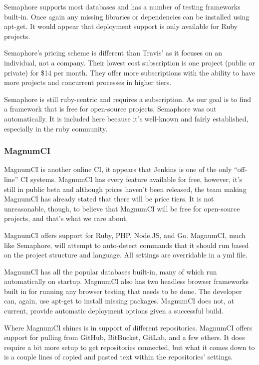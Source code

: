 \documentclass[11pt]{article}
\begin{document}
Semaphore supports most databases and has a number of testing frameworks built-in. Once again any missing libraries or dependencies can be installed using apt-get. It would appear that deployment support is only available for Ruby projects.

Semaphore's pricing scheme is different than Travis' as it focuses on an individual, not a company. Their lowest cost subscription is one project (public or private) for \$14 per month. They offer more subscriptions with the ability to have more projects and concurrent processes in higher tiers.

Semaphore is still ruby-centric and requires a subscription. As our goal is to find a framework that is free for open-source projects, Semaphore was out automatically. It is included here because it's well-known and fairly established, especially in the ruby community.

\subsubsection{MagnumCI \cite{MagnumCI}}
MagnumCI is another online CI, it appears that Jenkins is one of the only ``off-line'' CI systems. MagnumCI has every feature available for free, however, it's still in public beta and although prices haven't been released, the team making MagnumCI has already stated that there will be price tiers. It is not unreasonable, though, to believe that MagnumCI will be free for open-source projects, and that's what we care about.

MagnumCI offers support for Ruby, PHP, Node.JS, and Go. MagnumCI, much like Semaphore, will attempt to auto-detect commands that it should run based on the project structure and language. All settings are overridable in a yml file.

MagnumCI has all the popular databases built-in, many of which run automatically on startup. MagnumCI also has two headless browser frameworks built in for running any browser testing that needs to be done. The developer can, again, use apt-get to install missing packages. MagnumCI does not, at current, provide automatic deployment options given a successful build.

Where MagnumCI shines is in support of different repositories. MagnumCI offers support for pulling from GitHub, BitBucket, GitLab, and a few others. It does require a bit more setup to get repositories connected, but what it comes down to is a couple lines of copied and pasted text within the repositories' settings.
\end{document}
